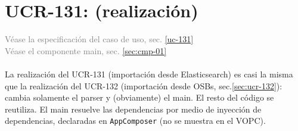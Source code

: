 \section{UCR-131: \ucCXxxiTitle{}(realizaci\'on)}\label{sec:ucr-131}
\textcolor{gray}{V\'ease la especificaci\'on del caso de uso, sec. \ref{uc-131}}\\
\textcolor{gray}{V\'ease el componente main, sec. \ref{sec:cmp-01}}

\paragraph{}
La realizaci\'on del UCR-131 (importaci\'on desde Elasticsearch) es casi la misma que la 
realizaci\'on del UCR-132 (importaci\'on desde OSBs, sec.\ref{sec:ucr-132}):
%
cambia solamente el parser y (obviamente) el main.
El resto del c\'odigo se reutiliza.
El main resuelve las dependencias por medio de inyecci\'on de dependencias,
declaradas en \verb|AppComposer| (no se muestra en el VOPC).

